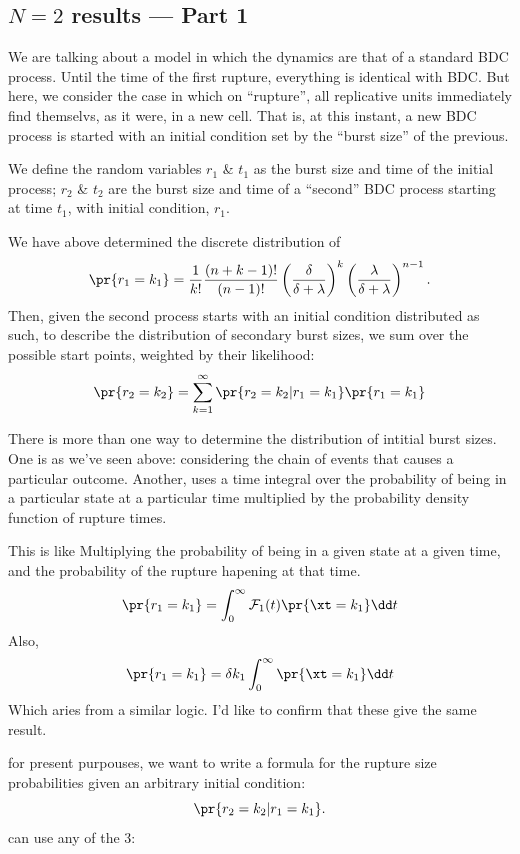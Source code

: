 \subsection{$N = 2$ results --- Part 1}



We are talking about a model in which the dynamics are that of a standard BDC process. Until the time of the first rupture, everything is identical with BDC. But here, we consider the case in which on ``rupture'', all replicative units immediately find themselvs, as it were, in a new cell. That is, at this instant, a new BDC process is started with an initial condition set by the ``burst size'' of the previous. \par
We define the random variables $r_1$ \& $t_1$ as the burst size and time of the initial process; $r_2$ \& $t_2$ are the burst size and time of a ``second'' BDC process starting at time $t_1$, with initial condition, $r_1$.  \par
We have above determined the discrete distribution of 
$$\pr{r_1 = k_1} =    \frac{1}{k!}\frac{(n+k-1)!}{(n-1)!}    \left(\frac{\delta}{\delta + \lambda}\right)^{k} \left(\frac{\lambda}{\delta + \lambda}\right)^{n-1}.$$
Then, given the second process starts with an initial condition distributed as such, to describe the distribution of secondary burst sizes, we sum over the possible start points, weighted by their likelihood:
$$\pr{r_2 = k_2} = \sum_{k=1}^\infty \pr{r_2 = k_2 | r_1 = k_1}\pr{r_1 = k_1}$$


There is more than one way to determine the distribution of intitial burst sizes. One is as we've seen above: considering the chain of events that causes a particular outcome. Another, uses a time integral over the probability of being in a particular state at a particular time multiplied by the probability density function of rupture times. 

This is like Multiplying the probability of being in a given state at a given time, and the probability of the rupture hapening at that time. 
$$\pr{r_1 = k_1} = \int_0^{\infty}{\mathcal{F}_{1}(t)\pr{\xt = k_1}}\dd t$$
Also,
$$\pr{r_1 = k_1} = \delta k_1\int_0^{\infty}{\pr{\xt = k_1}}\dd t$$
Which aries from a similar logic. I'd like to confirm that these give the same result.\par
for present purpouses, we want to write a formula for the rupture size probabilities given an arbitrary initial condition:
$$\pr{r_2 = k_2 | r_1 = k_1}.$$
can use any of the 3:




